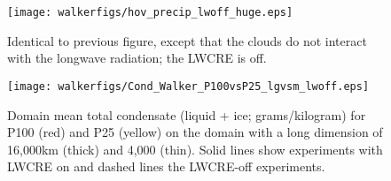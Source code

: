 \documentclass[draft]{agujournal2019}
\begin{document}
{\begin{figure}
  \texttt{[image: walkerfigs/hov\_precip\_lwoff\_huge.eps]}
  \caption{Identical to previous figure, except that the clouds do not interact with the longwave radiation; the LWCRE is off.}
  \label{fig:domdep_lwoff}
\end{figure}

\begin{figure}
  \centering
       \texttt{[image: walkerfigs/Cond\_Walker\_P100vsP25\_lgvsm\_lwoff.eps]}
          \caption{Domain mean total condensate (liquid + ice; grams/kilogram) for P100 (red) and P25 (yellow) on the domain 
          with a long dimension of 16,000km (thick) and 4,000 (thin).  Solid lines show experiments with LWCRE on
          and dashed lines the LWCRE-off experiments.}
  \label{fig:TotCond_P25P100}
\end{figure}


}
\end{document}
